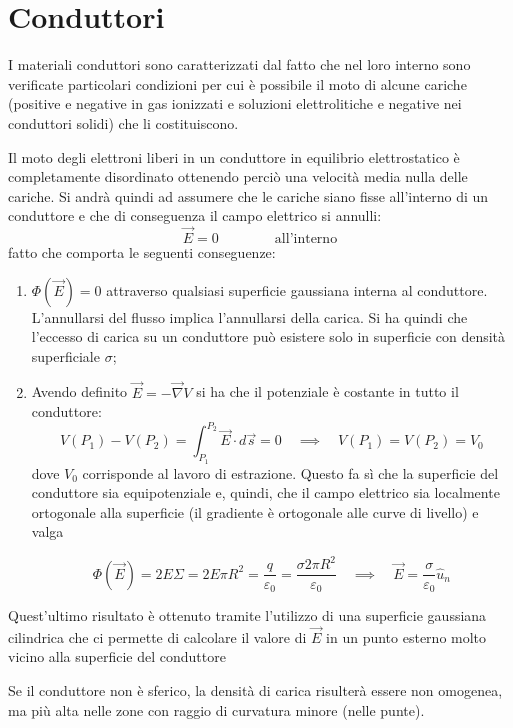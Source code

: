\documentclass[x11names]{report}
\begin{document}
\section{Conduttori}
I materiali conduttori sono caratterizzati dal fatto che nel loro interno sono verificate particolari condizioni per cui è possibile il moto di alcune cariche (positive e negative in gas ionizzati e soluzioni elettrolitiche e negative nei conduttori solidi) che li costituiscono.

Il moto degli elettroni liberi in un conduttore in equilibrio elettrostatico è completamente disordinato ottenendo perciò una velocità media nulla delle cariche. Si andrà quindi ad assumere che le cariche siano fisse all'interno di un conduttore e che di conseguenza il campo elettrico si annulli:
\[
\vec{E} = 0 \qquad\qquad \text{all'interno}
\]
fatto che comporta le seguenti conseguenze:
\begin{enumerate}
	\item \(\Phi(\vec{E}) = 0\) attraverso qualsiasi superficie gaussiana interna al conduttore. L'annullarsi del flusso implica l'annullarsi della carica. Si ha quindi che l'eccesso di carica su un conduttore può esistere solo in superficie con densità superficiale \(\sigma\);
	\item Avendo definito \(\vec{E} = - \vec{\nabla}V\) si ha che il potenziale è costante in tutto il conduttore:
	\[
	V(P_1) - V(P_2) = \int_{P_1}^{P_2}\vec{E} \cdot d\vec{s} = 0 \quad \implies \quad V(P_1) = V(P_2) = V_0
	\]
	dove \(V_0\) corrisponde al lavoro di estrazione.
	Questo fa sì che la superficie del conduttore sia equipotenziale e, quindi, che il campo elettrico sia localmente ortogonale alla superficie (il gradiente è ortogonale alle curve di livello) e valga
	
	\[
	\Phi(\vec{E}) = 2 E\Sigma = 2 E\pi R^2 = \frac{q}{\varepsilon_0} = \frac{\sigma 2\pi R^2}{\varepsilon_0} \quad \implies \quad \vec{E} = \frac{\sigma}{\varepsilon_0}\hat{u}_n
	\]
\end{enumerate}
Quest'ultimo risultato è ottenuto tramite l'utilizzo di una superficie gaussiana cilindrica che ci permette di calcolare il valore di \(\vec{E}\) in un punto esterno molto vicino alla superficie del conduttore
\begin{figure}[H]
	\centering
\end{figure}
Se il conduttore non è sferico, la densità di carica risulterà essere non omogenea, ma più alta nelle zone con raggio di curvatura minore (nelle punte).
\end{document}
